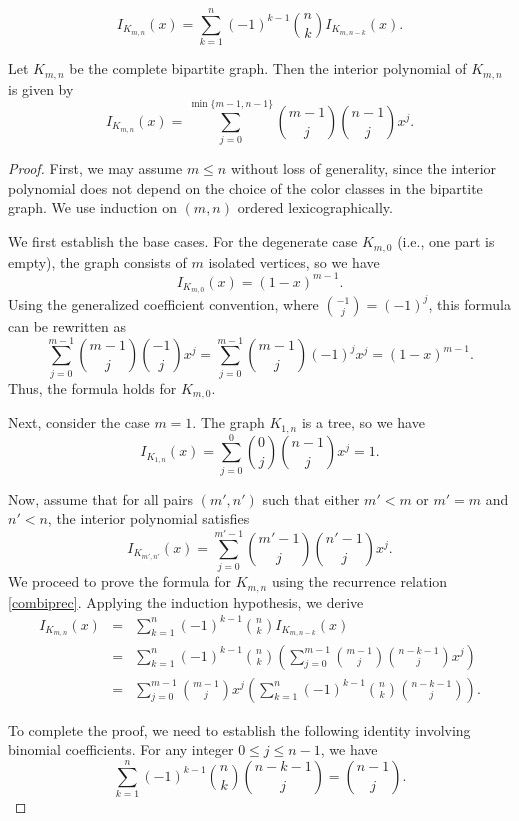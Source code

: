 \documentclass[10pt,a4paper]{amsart}
\begin{document}
\begin{equation}\label{combiprec}
I_{K_{m,n}}(x) = \sum_{k=1}^{n} (-1)^{k-1} \binom{n}{k} I_{K_{m,n-k}}(x).
\end{equation}

\begin{theorem}\label{thm:complete}
Let $K_{m,n}$ be the complete bipartite graph. Then the interior polynomial of $K_{m,n}$ is given by
\[
I_{K_{m,n}}(x)=\sum_{j=0}^{\min\{m-1,n-1\}}\binom{m-1}{j}\binom{n-1}{j}x^j.
\]
\end{theorem}

\begin{proof}
First, we may assume $m \le n$ without loss of generality, since the interior polynomial does not depend on the choice of the color classes in the bipartite graph. We use induction on $(m,n)$ ordered lexicographically.

We first establish the base cases.  
For the degenerate case $K_{m,0}$ (i.e., one part is empty), the graph consists of $m$ isolated vertices, so we have
\[
I_{K_{m,0}}(x)=(1-x)^{m-1}.
\]
Using the generalized coefficient convention, where $\binom{-1}{j}=(-1)^j$, this formula can be rewritten as
\[
\sum_{j=0}^{m-1}\binom{m-1}{j}\binom{-1}{j}x^j=\sum_{j=0}^{m-1}\binom{m-1}{j}(-1)^j x^j=(1-x)^{m-1}.
\]
Thus, the formula holds for $K_{m,0}$.

Next, consider the case $m=1$. The graph $K_{1,n}$ is a tree, so we have
\[
I_{K_{1,n}}(x)=\sum_{j=0}^{0}\binom{0}{j}\binom{n-1}{j}x^j=1.
\]

Now, assume that for all pairs $(m',n')$ such that either $m'<m$ or $m'=m$ and $n'<n$, the interior polynomial satisfies
\[
I_{K_{m',n'}}(x)=\sum_{j=0}^{m'-1}\binom{m'-1}{j}\binom{n'-1}{j}x^j.
\]
We proceed to prove the formula for $K_{m,n}$ using the recurrence relation \eqref{combiprec}. Applying the induction hypothesis, we derive
\begin{eqnarray*}
I_{K_{m,n}}(x) &=& \sum_{k=1}^{n} (-1)^{k-1} \binom{n}{k} I_{K_{m,n-k}}(x)\\
&=&\sum_{k=1}^{n}(-1)^{k-1}\binom{n}{k}\left(\sum_{j=0}^{m-1}\binom{m-1}{j}\binom{n-k-1}{j}x^j\right)\\
&=&\sum_{j=0}^{m-1}\binom{m-1}{j}x^j\left(\sum_{k=1}^{n}(-1)^{k-1}\binom{n}{k}\binom{n-k-1}{j}\right).
\end{eqnarray*}

To complete the proof, we need to establish the following identity involving binomial coefficients. For any integer $0 \le j \le n-1$, we have
\begin{equation}\label{eq:binom_identity}
\sum_{k=1}^{n}(-1)^{k-1}\binom{n}{k}\binom{n-k-1}{j}=\binom{n-1}{j}.
\end{equation}


\end{proof}
\end{document}
